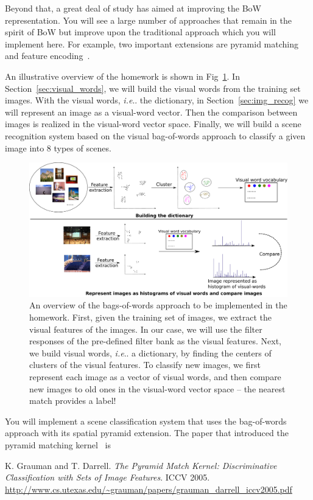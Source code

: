 \documentclass[10pt]{article}
\makeatletter
\DeclareRobustCommand\onedot{\futurelet\@let@token\@onedot}
\def\@onedot{\ifx\@let@token.\else.\null\fi\xspace}
\def\ie{\emph{i.e}\onedot} \def\Ie{\emph{I.e}\onedot}
\makeatother
\begin{document}
Beyond that, a great deal of study has aimed at improving the BoW representation. You will see a large number of approaches that remain in the spirit of BoW but improve upon the traditional approach which you will implement here. For example, two important extensions are pyramid matching~\cite{1544890,1641019} and feature encoding~\cite{Chatfield11}.

An illustrative overview of the homework is shown in Fig~\ref{fig:overview}. In Section~\ref{sec:visual_words}, we will build the visual words from the training set images. With the visual words, \ie the dictionary, in Section~\ref{sec:img_recog} we will represent an image as a visual-word vector. Then the comparison between images is realized in the visual-word vector space. Finally, we will build a scene recognition system based on the visual bag-of-words approach to classify a given image into $8$ types of scenes.
\begin{figure}[!h]
    \centering
    \includegraphics[width=\textwidth]{./figures/overview.pdf}
    \caption{An overview of the bags-of-words approach to be implemented in the homework. First, given the training set of images, we extract the visual features of the images. In our case, we will use the filter responses of the pre-defined filter bank as the visual features. Next, we build visual words, \ie a dictionary, by finding the centers of clusters of the visual features. To classify new images, we first represent each image as a vector of visual words, and then compare new images to old ones in the visual-word vector space -- the nearest match provides a label!}
    \label{fig:overview}
\end{figure}

\par {}
You will implement a scene classification system that uses the bag-of-words approach with its spatial pyramid extension. The paper that introduced the pyramid matching kernel~\cite{1544890} is
\begin{center}\parbox{5in}{
K. Grauman and T. Darrell. {\it The Pyramid Match Kernel: Discriminative Classification with Sets of Image Features}. ICCV 2005. \url{http://www.cs.utexas.edu/~grauman/papers/grauman_darrell_iccv2005.pdf}
}
\end{center}
\end{document}
